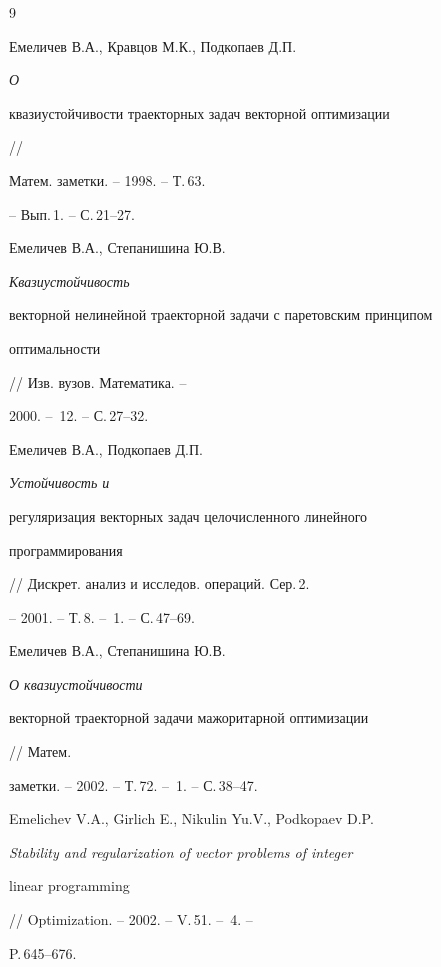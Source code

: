 \begin{thebibliography}{9}










Емеличев В.А., Кравцов М.К., Подкопаев Д.П. {\em О


квазиустойчивости траекторных задач векторной оптимизации} //


Матем. заметки. -- 1998. -- Т.\,63.


-- Вып.\,1. -- С.\,21--27.







Емеличев В.А., Степанишина Ю.В. {\em Квазиустойчивость


векторной нелинейной траекторной задачи с паретовским принципом


оптимальности} // Изв. вузов. Математика. --


2000. -- \No\,12. -- С.\,27--32.







Емеличев В.А., Подкопаев Д.П. {\em Устойчивость и


регуляризация векторных задач целочисленного линейного


программирования} // Дискрет. анализ и исследов. операций. Сер.\,2.


-- 2001. -- Т.\,8. -- \No\,1. -- С.\,47--69.





 Емеличев В.А., Степанишина Ю.В. {\em О квазиустойчивости


векторной траекторной задачи мажоритарной оптимизации} // Матем.


заметки. -- 2002. -- Т.\,72. -- \No\,1. -- С.\,38--47.





 Emelichev V.A., Girlich E., Nikulin Yu.V., Podkopaev D.P.


{\em Stability and regularization of vector problems of integer


linear programming} // Optimization. -- 2002. -- V.\,51. -- \No\,4. --


P.\,645--676.






\end{thebibliography}
